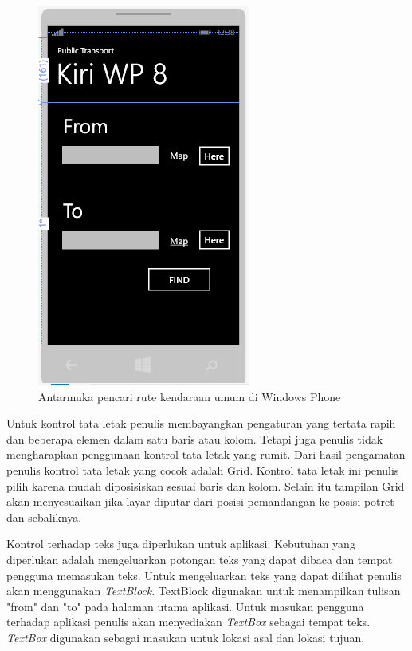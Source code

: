 \begin{figure}[h]
	\centering
		\includegraphics[scale=0.6]{Gambar/kontrol/control.PNG}
	\caption{Antarmuka pencari rute kendaraan umum di Windows Phone}
	\label{fig:antarmuka}
\end{figure}

\newpage

\hspace{0.5cm} Untuk kontrol tata letak penulis membayangkan pengaturan yang tertata rapih dan beberapa elemen dalam satu baris atau kolom. Tetapi juga penulis tidak mengharapkan penggunaan kontrol tata letak yang rumit. Dari hasil pengamatan penulis kontrol tata letak yang cocok adalah Grid. Kontrol tata letak ini penulis pilih karena mudah diposisiskan sesuai baris dan kolom. Selain itu tampilan Grid akan menyesuaikan jika layar diputar dari posisi pemandangan ke posisi potret dan sebaliknya.

\hspace{0.5cm} Kontrol terhadap teks juga diperlukan untuk aplikasi. Kebutuhan yang diperlukan adalah mengeluarkan potongan teks yang dapat dibaca dan tempat pengguna memasukan teks. Untuk mengeluarkan teks yang dapat dilihat penulis akan menggunakan \textit{TextBlock}. TextBlock digunakan untuk menampilkan tulisan "from" dan "to" pada halaman utama aplikasi. Untuk masukan pengguna terhadap aplikasi penulis akan menyediakan \textit{TextBox} sebagai tempat teks. \textit{TextBox} digunakan sebagai masukan untuk lokasi asal dan lokasi tujuan.

